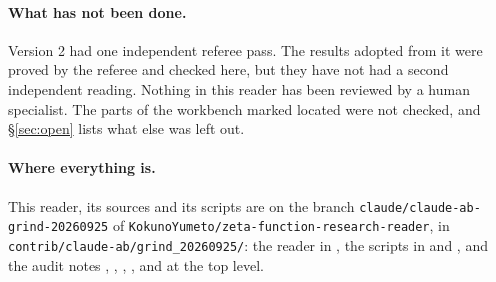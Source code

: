 \paragraph{What has not been done.}
Version 2 had one independent referee pass. The results adopted from it were proved by the referee and checked here, but they have not had a second independent reading. Nothing in this reader has been reviewed by a human specialist. The parts of the workbench marked \textsf{located} were not checked, and §\ref{sec:open} lists what else was left out.

\paragraph{Where everything is.}
This reader, its sources and its scripts are on the branch \texttt{claude/claude-ab-grind-20260925} of \texttt{KokunoYumeto/zeta-function-research-reader}, in \texttt{contrib/claude-ab/grind\_20260925/}: the reader in , the scripts in  and , and the audit notes , , , ,  and  at the top level.
